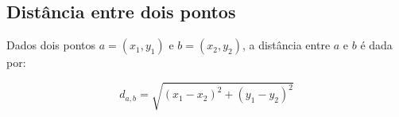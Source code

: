 \subsection{Distância entre dois pontos}

Dados dois pontos $a = (x_1,y_1)$ e $b = (x_2,y_2)$, a distância entre $a$ e $b$ é dada por:

\[
d_{a,b} = \sqrt{(x_1 - x_2)^2 + (y_1 - y_2)^2}
\]
